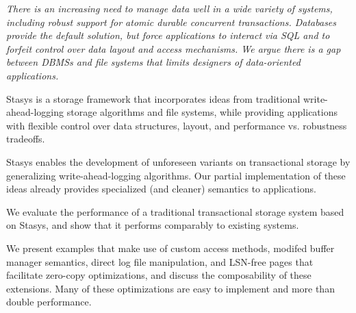 \documentclass[letterpaper,twocolumn,10pt]{article}
\newcommand{\yad}{Stasys\xspace}
\begin{document}
{\em There is an increasing need to manage data well in a wide variety of
systems, including robust support for atomic durable concurrent
transactions.  Databases provide the default solution, but force
applications to interact via SQL and to forfeit control over data
layout and access mechanisms.  We argue there is a gap between DBMSs and file systems that limits designers of data-oriented applications.

\yad is a storage framework that incorporates ideas from traditional
write-ahead-logging storage algorithms and file systems,
while providing applications with flexible control over data structures, layout, and performance vs. robustness tradeoffs.

\yad enables the development of
unforeseen variants on transactional storage by generalizing
write-ahead-logging algorithms.  Our partial implementation of these
ideas already provides specialized (and cleaner) semantics to applications.


We evaluate the performance of a traditional transactional storage
system based on \yad, and show that it performs comparably to existing
systems.  

We present examples that make use of custom access methods, modifed
buffer manager semantics, direct log file manipulation, and LSN-free
pages that facilitate zero-copy optimizations, and discuss the
composability of these extensions.  Many of these optimizations are
easy to implement and more than double performance.

}
\end{document}

